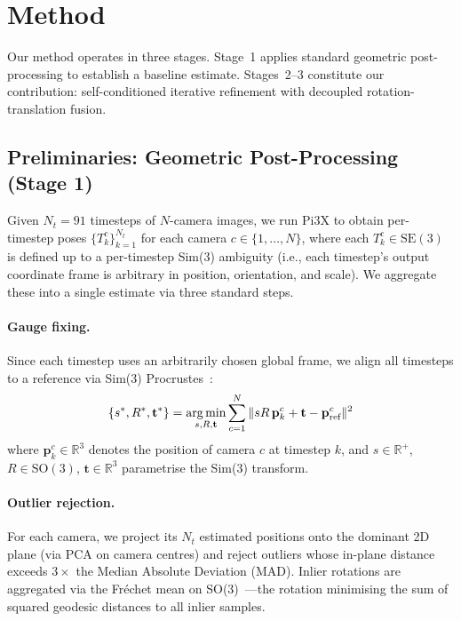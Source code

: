 \section{Method}
\label{sec:method}

Our method operates in three stages. Stage~1 applies standard geometric post-processing to establish a baseline estimate. Stages~2--3 constitute our contribution: self-conditioned iterative refinement with decoupled rotation-translation fusion.

\subsection{Preliminaries: Geometric Post-Processing (Stage 1)}
\label{sec:stage1}

Given $N_t = 91$ timesteps of $N$-camera images, we run Pi3X to obtain per-timestep poses $\{T_k^c\}_{k=1}^{N_t}$ for each camera $c \in \{1,\ldots,N\}$, where each $T_k^c \in \text{SE}(3)$ is defined up to a per-timestep Sim(3) ambiguity (i.e., each timestep's output coordinate frame is arbitrary in position, orientation, and scale). We aggregate these into a single estimate via three standard steps.

\paragraph{Gauge fixing.} Since each timestep uses an arbitrarily chosen global frame, we align all timesteps to a reference via Sim(3) Procrustes~\cite{umeyama1991}:
\begin{equation}
    \{s^*, R^*, \mathbf{t}^*\} = \operatorname*{arg\,min}_{s, R, \mathbf{t}} \sum_{c=1}^N \| s R \, \mathbf{p}_k^c + \mathbf{t} - \mathbf{p}_{\text{ref}}^c \|^2
\end{equation}
where $\mathbf{p}_k^c \in \mathbb{R}^3$ denotes the position of camera $c$ at timestep $k$, and $s \in \mathbb{R}^+$, $R \in \text{SO}(3)$, $\mathbf{t} \in \mathbb{R}^3$ parametrise the Sim(3) transform.

\paragraph{Outlier rejection.} For each camera, we project its $N_t$ estimated positions onto the dominant 2D plane (via PCA on camera centres) and reject outliers whose in-plane distance exceeds $3\times$ the Median Absolute Deviation (MAD). Inlier rotations are aggregated via the Fr\'{e}chet mean on SO(3)~\cite{moakher2002}---the rotation minimising the sum of squared geodesic distances to all inlier samples.

